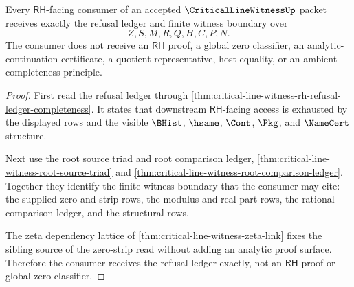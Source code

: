 \begin{theorem}
\label{thm:critical-line-witness-rh-consumer-refusal-exactness}
Every $\mathsf{RH}$-facing consumer of an accepted $\CriticalLineWitnessUp$ packet receives exactly the refusal ledger and finite witness boundary over
$$
Z,S,M,R,Q,H,C,P,N.
$$
The consumer does not receive an $\mathsf{RH}$ proof, a global zero classifier, an analytic-continuation certificate, a quotient representative, host equality, or an ambient-completeness principle.
\end{theorem}
\begin{proof}
First read the refusal ledger through \autoref{thm:critical-line-witness-rh-refusal-ledger-completeness}. It states that downstream $\mathsf{RH}$-facing access is exhausted by the displayed rows and the visible $\BHist$, $\hsame$, $\Cont$, $\Pkg$, and $\NameCert$ structure.

Next use the root source triad and root comparison ledger, \autoref{thm:critical-line-witness-root-source-triad} and \autoref{thm:critical-line-witness-root-comparison-ledger}. Together they identify the finite witness boundary that the consumer may cite: the supplied zero and strip rows, the modulus and real-part rows, the rational comparison ledger, and the structural rows.

The zeta dependency lattice of \autoref{thm:critical-line-witness-zeta-link} fixes the sibling source of the zero-strip read without adding an analytic proof surface. Therefore the consumer receives the refusal ledger exactly, not an $\mathsf{RH}$ proof or global zero classifier.
\end{proof}
